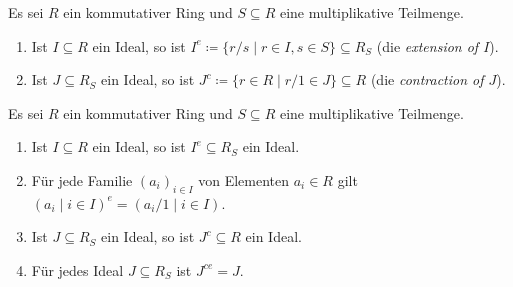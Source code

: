 \documentclass[a4paper,10pt]{scrartcl}
\begin{document}
\begin{definition}
  Es sei $R$ ein kommutativer Ring und $S \subseteq R$ eine multiplikative Teilmenge.
  \begin{enumerate}
    \item
      Ist $I \subseteq R$ ein Ideal, so ist $I^e \coloneqq \{r/s \mid r \in I, s \in S\} \subseteq R_S$ (die \emph{extension of $I$}).
    \item
      Ist $J \subseteq R_S$ ein Ideal, so ist $J^c \coloneqq \{r \in R \mid r/1 \in J\} \subseteq R$
      (die \emph{contraction of $J$}).
  \end{enumerate}
\end{definition}


\begin{proposition}
  \label{prop: extension and contraction for localizations}
  Es sei $R$ ein kommutativer Ring und $S \subseteq R$ eine multiplikative Teilmenge.
  \begin{enumerate}
    \item
      Ist $I \subseteq R$ ein Ideal, so ist $I^e \subseteq R_S$ ein Ideal.
    \item
      Für jede Familie $(a_i)_{i \in I}$ von Elementen $a_i \in R$ gilt $(a_i \mid i \in I)^e = (a_i/1 \mid i \in I)$.
    \item
      Ist $J \subseteq R_S$ ein Ideal, so ist $J^c \subseteq R$ ein Ideal.
    \item
      Für jedes Ideal $J \subseteq R_S$ ist $J^{ce} = J$.
  \end{enumerate}
\end{proposition}
\end{document}
